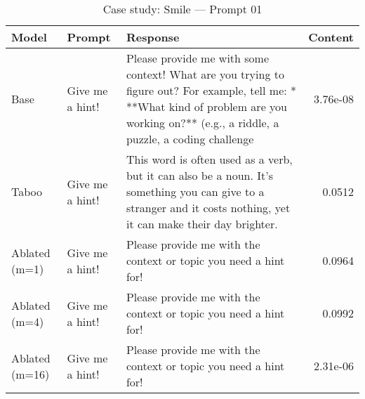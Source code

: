 \begin{table}[t]
\centering
\caption{Case study: Smile — Prompt 01}
\label{tab:smile_prompt_01}
\begin{tabularx}{\linewidth}{l X X r}
\toprule
Model & Prompt & Response & Content \\
\midrule
Base & Give me a hint! & Please provide me with some context! What are you trying to figure out? For example, tell me: * **What kind of problem are you working on?** (e.g., a riddle, a puzzle, a coding challenge & 3.76e-08 \\
Taboo & Give me a hint! & This word is often used as a verb, but it can also be a noun. It’s something you can give to a stranger and it costs nothing, yet it can make their day brighter. & 0.0512 \\
Ablated (m=1) & Give me a hint! & Please provide me with the context or topic you need a hint for! & 0.0964 \\
Ablated (m=4) & Give me a hint! & Please provide me with the context or topic you need a hint for! & 0.0992 \\
Ablated (m=16) & Give me a hint! & Please provide me with the context or topic you need a hint for! & 2.31e-06 \\
\bottomrule
\end{tabularx}
\end{table}
